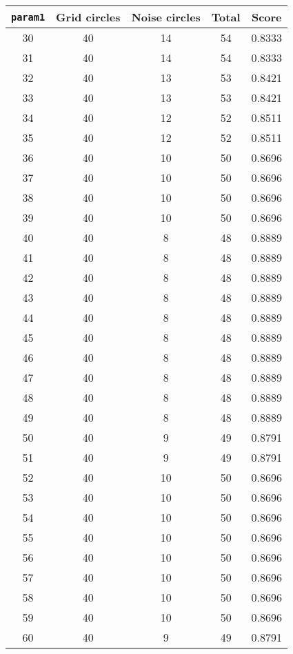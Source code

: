 \documentclass[letterpaper, 12pt]{article}
\begin{document}
\begin{longtable}{|c|c|c|c|c|}
\hline
\textbf{\texttt{param1}} & \textbf{Grid circles} & \textbf{Noise circles} & \textbf{Total} & \textbf{Score} \\
\hline
30 & 40 & 14 & 54 & 0.8333 \\
\hline
31 & 40 & 14 & 54 & 0.8333 \\
\hline
32 & 40 & 13 & 53 & 0.8421 \\
\hline
33 & 40 & 13 & 53 & 0.8421 \\
\hline
34 & 40 & 12 & 52 & 0.8511 \\
\hline
35 & 40 & 12 & 52 & 0.8511 \\
\hline
36 & 40 & 10 & 50 & 0.8696 \\
\hline
37 & 40 & 10 & 50 & 0.8696 \\
\hline
38 & 40 & 10 & 50 & 0.8696 \\
\hline
39 & 40 & 10 & 50 & 0.8696 \\
\hline
40 & 40 & 8 & 48 & 0.8889 \\
\hline
41 & 40 & 8 & 48 & 0.8889 \\
\hline
42 & 40 & 8 & 48 & 0.8889 \\
\hline
43 & 40 & 8 & 48 & 0.8889 \\
\hline
44 & 40 & 8 & 48 & 0.8889 \\
\hline
45 & 40 & 8 & 48 & 0.8889 \\
\hline
46 & 40 & 8 & 48 & 0.8889 \\
\hline
47 & 40 & 8 & 48 & 0.8889 \\
\hline
48 & 40 & 8 & 48 & 0.8889 \\
\hline
49 & 40 & 8 & 48 & 0.8889 \\
\hline
50 & 40 & 9 & 49 & 0.8791 \\
\hline
51 & 40 & 9 & 49 & 0.8791 \\
\hline
52 & 40 & 10 & 50 & 0.8696 \\
\hline
53 & 40 & 10 & 50 & 0.8696 \\
\hline
54 & 40 & 10 & 50 & 0.8696 \\
\hline
55 & 40 & 10 & 50 & 0.8696 \\
\hline
56 & 40 & 10 & 50 & 0.8696 \\
\hline
57 & 40 & 10 & 50 & 0.8696 \\
\hline
58 & 40 & 10 & 50 & 0.8696 \\
\hline
59 & 40 & 10 & 50 & 0.8696 \\
\hline
60 & 40 & 9 & 49 & 0.8791 \\

\end{longtable}
\end{document}
